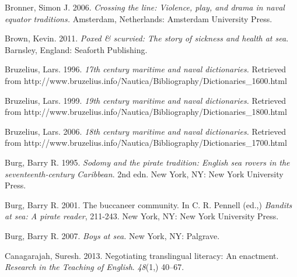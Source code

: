 \begin{styleStandard}
Bronner, Simon J. 2006.\textit{ Crossing the line: Violence, play, and drama in naval equator traditions. }Amsterdam, Netherlands: Amsterdam University Press. 
\end{styleStandard}


\begin{styleStandard}
Brown, Kevin. 2011. \textit{Poxed \& scurvied: The story of sickness and health at sea}. Barnsley, England: Seaforth Publishing.
\end{styleStandard}


\begin{styleStandard}
Bruzelius, Lars. 1996. \textit{17th century maritime and naval dictionaries. }Retrieved from http://www.bruzelius.info/Nautica/Bibliography/Dictionaries\_1600.html \ 
\end{styleStandard}


\begin{styleStandard}
Bruzelius, Lars. 1999. \textit{19th century maritime and naval dictionaries. }Retrieved from http://www.bruzelius.info/Nautica/Bibliography/Dictionaries\_1800.html 
\end{styleStandard}


\begin{styleStandard}
Bruzelius, Lars. 2006. \textit{18th century maritime and naval dictionaries. }Retrieved from http://www.bruzelius.info/Nautica/Bibliography/Dictionaries\_1700.html 
\end{styleStandard}


\begin{styleStandard}
Burg, Barry R. 1995. \textit{Sodomy and the pirate tradition: English sea rovers in the seventeenth-century Caribbean}. 2nd edn. New York, NY: New York University Press. 
\end{styleStandard}


\begin{styleStandard}
Burg, Barry R. 2001. The buccaneer community. In C. R. Pennell (ed.,) \textit{Bandits at sea: A pirate reader}, 211-243. New York, NY: New York University Press.
\end{styleStandard}


\begin{styleStandard}
Burg, Barry R. 2007. \textit{Boys at sea.} New York, NY: Palgrave.
\end{styleStandard}


\begin{styleStandard}
Canagarajah, Suresh. 2013. Negotiating translingual literacy: An enactment. \textit{Research in the Teaching of English}. \textit{48}(1,) 40–67.
\end{styleStandard}


